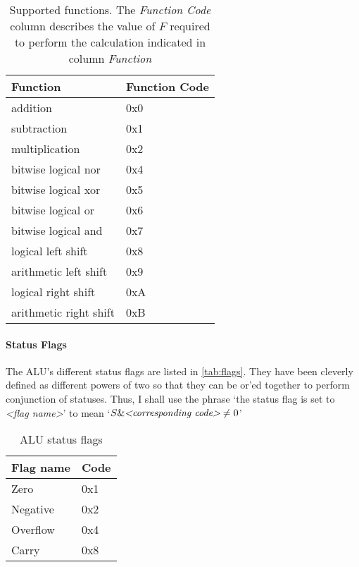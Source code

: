 \documentclass{article}
\begin{document}
\begin{table}[htbp]
  \centering
  \begin{tabular}{|l|l|}
    \hline
    {\bf Function}         & {\bf Function Code} \\ \hline
    addition               & 0x0 \\ \hline
    subtraction            & 0x1 \\ \hline
    multiplication         & 0x2 \\ \hline
    bitwise logical nor    & 0x4 \\ \hline
    bitwise logical xor    & 0x5 \\ \hline
    bitwise logical or     & 0x6 \\ \hline
    bitwise logical and    & 0x7 \\ \hline
    logical left shift     & 0x8 \\ \hline
    arithmetic left shift  & 0x9 \\ \hline
    logical right shift    & 0xA \\ \hline
    arithmetic right shift & 0xB \\ \hline

  \end{tabular}
  \caption{Supported functions. The \emph{Function Code} column describes the value of $F$ required to perform the calculation indicated in column \emph{Function}}
  \label{tab:functions}
\end{table}

\paragraph{Status Flags}
\label{flags}
The ALU's different status flags are listed in \autoref{tab:flags}. They have been cleverly defined as different powers of two so that they can be or'ed together to perform conjunction of statuses. Thus, I shall use the phrase `the status flag is set to \emph{\textless{}flag name\textgreater{}}' to mean `$S \& \emph{\textless{}corresponding code\textgreater{}} \neq 0$'
\begin{table}[htbp]
  \centering
  \begin{tabular}{|l|l|}
    \hline
    \textbf{Flag name} & \textbf{Code} \\ \hline
    Zero     & 0x1 \\ \hline
    Negative & 0x2 \\ \hline
    Overflow & 0x4 \\ \hline
    Carry    & 0x8 \\ \hline
  \end{tabular}
  \caption{ALU status flags}
  \label{tab:flags}
\end{table}
\end{document}
